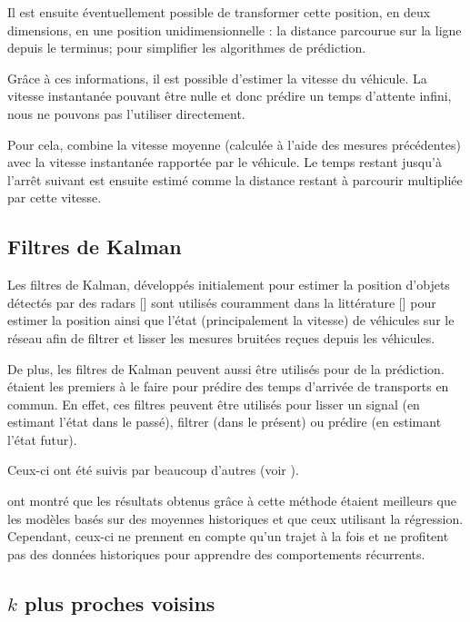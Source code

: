 \documentclass[letterpaper]{article}
\begin{document}
Il est ensuite éventuellement possible de transformer cette position, en deux dimensions, en une position unidimensionnelle : la distance parcourue sur la ligne depuis le terminus; pour simplifier les algorithmes de prédiction.

Grâce à ces informations, il est possible d'estimer la vitesse du véhicule. La vitesse instantanée pouvant être nulle et donc prédire un temps d'attente infini, nous ne pouvons pas l'utiliser directement.

Pour cela, \cite{Maciver2002} combine la vitesse moyenne (calculée à l'aide des mesures précédentes) avec la vitesse instantanée rapportée par le véhicule. Le temps restant jusqu'à l'arrêt suivant est ensuite estimé comme la distance restant à parcourir multipliée par cette vitesse.


\subsection{Filtres de Kalman}

Les filtres de Kalman, développés initialement pour estimer la position d'objets détectés par des radars [\cite{kalman1960new}] sont utilisés couramment dans la littérature [\cite{wall1999algorithm, cathey2003prescription, shalaby2004prediction}] pour estimer la position ainsi que l'état (principalement la vitesse) de véhicules sur le réseau afin de filtrer et lisser les mesures bruitées reçues depuis les véhicules.

De plus, les filtres de Kalman peuvent aussi être utilisés pour de la prédiction. \cite{cathey2003prescription} étaient les premiers à le faire pour prédire des temps d'arrivée de transports en commun. En effet, ces filtres peuvent être utilisés pour lisser un signal (en estimant l'état dans le passé), filtrer (dans le présent) ou prédire (en estimant l'état futur).

Ceux-ci ont été suivis par beaucoup d'autres (voir \cite{yang2005travel, Altinkaya2013}).

\cite{cathey2003prescription} ont montré que les résultats obtenus grâce à cette méthode étaient meilleurs que les modèles basés sur des moyennes historiques et que ceux utilisant la régression. Cependant, ceux-ci ne prennent en compte qu'un trajet à la fois et ne profitent pas des données historiques pour apprendre des comportements récurrents.

\subsection{$k$ plus proches voisins}
\end{document}
